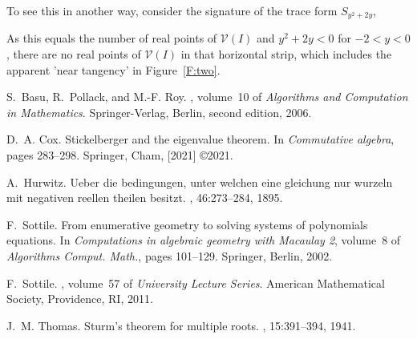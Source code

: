\documentclass[12pt]{amsart}
\theoremstyle{definition}
\newcommand{\calV}{\mathcal{V}}
\begin{document}
To see this in another way, consider the signature of the trace form $S_{y^2+2y}$,
%
\begin{leftbar}

\end{leftbar}
%
As this equals the number of real points of $\calV(I)$ and $y^2+2y<0$ for $-2<y<0$, there are no real points of
$\calV(I)$ in that horizontal strip, which includes the apparent 'near tangency' in Figure~\ref{F:two}.

\begin{thebibliography}{1}

S.~Basu, R.~Pollack, and M.-F. Roy.
, volume~10 of {\em
  Algorithms and Computation in Mathematics}.
\newblock Springer-Verlag, Berlin, second edition, 2006.

D.~A. Cox.
\newblock Stickelberger and the eigenvalue theorem.
\newblock In {\em Commutative algebra}, pages 283--298. Springer, Cham, [2021]
  \copyright 2021.

A.~Hurwitz.
\newblock Ueber die bedingungen, unter welchen eine gleichung nur wurzeln mit
  negativen reellen theilen besitzt.
, 46:273--284, 1895.

F.~Sottile.
\newblock From enumerative geometry to solving systems of polynomials
  equations.
\newblock In {\em Computations in algebraic geometry with {M}acaulay 2},
  volume~8 of {\em Algorithms Comput. Math.}, pages 101--129. Springer, Berlin,
  2002.

F.~Sottile.
, volume~57 of {\em
  University Lecture Series}.
\newblock American Mathematical Society, Providence, RI, 2011.

J.~M. Thomas.
\newblock Sturm's theorem for multiple roots.
, 15:391--394, 1941.

\end{thebibliography}

\end{document}
